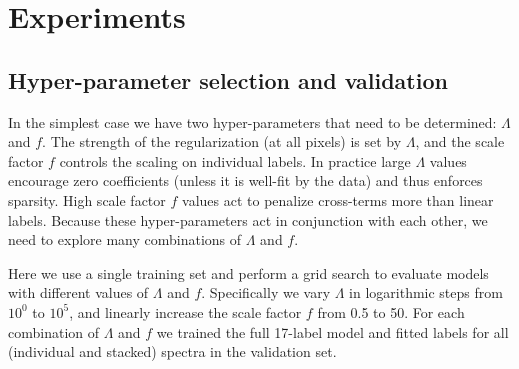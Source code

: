 \documentclass[12pt,preprint]{aastex}
\newcommand{\project}[1]{\textsl{#1}}
\newcommand{\TheCannon}{\project{The~Cannon}}
\begin{document}



\section{Experiments}
\label{sec:experiments}

\subsection{Hyper-parameter selection and validation}
\label{sec:hyper-parameter-validation}
In the simplest case we have two hyper-parameters that need to be 
determined: $\Lambda$ and $f$.  The strength of the regularization (at all 
pixels) is set by $\Lambda$, and the scale factor $f$ controls the scaling on 
individual labels.  In practice large $\Lambda$ values encourage zero 
coefficients (unless it is well-fit by the data) and thus enforces sparsity.  
High scale factor $f$ values act to penalize cross-terms more than linear labels. 
Because these hyper-parameters act in conjunction with each other, we need to
explore many combinations of $\Lambda$ and $f$.


Here we use a single training set and perform a grid search to evaluate models
with different values of $\Lambda$ and $f$.  Specifically we vary $\Lambda$ in
logarithmic steps from $10^0$ to $10^5$, and linearly increase the scale factor
$f$ from 0.5 to 50.  For each combination of $\Lambda$ and $f$ we trained the full
17-label model and fitted labels for all (individual and stacked) spectra in
the validation set.
\end{document}
